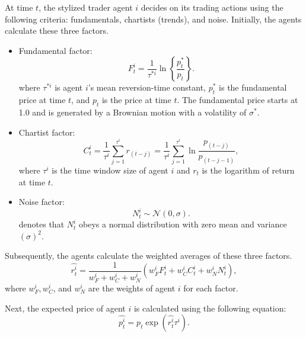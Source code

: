 At time $t$, the stylized trader agent $i$ decides on its trading actions using the following criteria: fundamentals, chartists (trends), and noise.
Initially, the agents calculate these three factors.
\begin{itemize}
    \item Fundamental factor:
          \begin{equation}
              F_t^i = \frac{1}{\tau^{*i}} \ln{\left\{\frac{p_t^*}{p_t}\right\}}.
          \end{equation}
          where $\tau^{*i}$ is agent $i$'s mean reversion-time constant, $p_t^*$ is the fundamental price at time $t$, and $p_t$ is the price at time $t$. The fundamental price starts at 1.0 and is generated by a Brownian motion with a volatility of $\sigma^{*}$.
    \item Chartist factor:
          \begin{equation}
              C_t^i = \frac{1}{\tau^i}\sum_{j=1}^{\tau^i} r_{(t-j)} = \frac{1}{\tau^i}\sum_{j=1}^{\tau^i}\ln{\frac{p_{(t-j)}}{p_{(t-j-1)}}},
          \end{equation}
          where $\tau^i$ is the time window size of agent $i$ and $r_t$ is the logarithm of return at time $t$.
    \item Noise factor:
          \begin{equation}
              N_t^i \sim \mathcal{N} (0, \sigma).
          \end{equation}
          denotes that $N_t^i$ obeys a normal distribution with zero mean and variance $(\sigma)^2$.
\end{itemize}

Subsequently, the agents calculate the weighted averages of these three factors.
\begin{equation}
    \widehat{r_t^i} = \frac{1}{w_F^i + w_C^i + w_N^i} \left(w_F^i F_t^i + w_C^i C_t^i + w_N^i N_t^i\right),
\end{equation}
where $w_F^i, w_C^i$, and $w_N^i$ are the weights of agent $i$ for each factor.

Next, the expected price of agent $i$ is calculated using the following equation:
\begin{equation}
    \widehat{p_t^i} = p_t \exp{\left(\widehat{r_t^i} \tau^i\right)}.
\end{equation}

